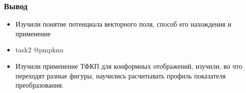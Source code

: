 \begin{frame}\frametitle{Вывод}
  \begin{itemize}
    \item Изучили понятие потенциала векторного поля,
      способ его нахождения и применение
    \item task2 @pmpknu
    \item Изучили применение ТФКП для конформных отображений,
      изучили, во что переходят разные фигуры,
      научились расчитывать профиль показателя преобразования.
  \end{itemize}
\end{frame}
